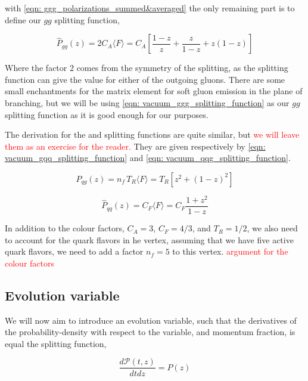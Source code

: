 \documentclass[main.tex]{subfiles}
\begin{document}
with \autoref{eqn: ggg_polarizations_summed&averaged} the only remaining part is to define our \(gg\) splitting function,

\begin{equation}\label{eqn: vacuum_ggg_splitting_function}
    \hat P_{gg}(z) = 2C_A \langle F \rangle = C_A \left[ \frac{1-z}{z} + \frac{z}{1-z} + z(1-z) \right]
\end{equation}

Where the factor \(2\) comes from the symmetry of the splitting, as the splitting function can give the value for either of the outgoing gluons.
There are some small enchantments for the matrix element for soft gluon emission in the plane of branching, but we will be using \autoref{eqn: vacuum_ggg_splitting_function} as our \(gg\) splitting function as it is good enough for our purposes.

The derivation for the \gqq and \qqg splitting functions are quite similar, but \textcolor{red}{we will leave them as an exercise for the reader.} They are given respectively by \autoref{eqn: vacuum_gqq_splitting_function} and \autoref{eqn: vacuum_qqg_splitting_function}.

\begin{equation}\label{eqn: vacuum_gqq_splitting_function}
    \hat P_{qg}(z) = n_f \, T_R \langle F \rangle = T_R \left[ z^2 + (1-z)^2 \right] 
\end{equation}

\begin{equation}\label{eqn: vacuum_qqg_splitting_function}
    \hat P_{qq} (z) = C_F \langle F \rangle = C_F \frac{1+z^2}{1-z}
\end{equation}

In addition to the colour factors, \(C_A = 3\), \(C_F=4/3\), and \(T_R=1/2\), we also need to account for the quark flavors in he \gqq vertex, assuming that we have five active quark flavors, we need to add a factor \(n_f = 5\) to this vertex.
\textcolor{red}{argument for the colour factors}

\subsection{Evolution variable}
We will now aim to introduce an evolution variable, such that the derivatives of the probability-density with respect to the variable, and momentum fraction, is equal the splitting function, 

\begin{equation}\label{eqn: evolutionvariable_condition}
    \frac{d \mathcal{P}(t,z)}{dt dz} = P(z)
\end{equation}
\end{document}
